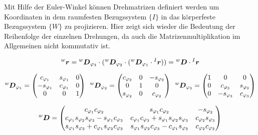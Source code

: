Mit Hilfe der Euler-Winkel können Drehmatrizen definiert werden um Koordinaten in dem raumfesten Bezugssystem $\{I\}$ in das körperfeste Bezugssystem $\{W\}$ zu projizieren. Hier zeigt sich wieder die Bedeutung der Reihenfolge der einzelnen Drehungen, da auch die Matrizenmultiplikation im Allgemeinen nicht kommutativ ist.

\begin{equation}
\prescript{w}{}{}\boldsymbol{r} = \prescript{w}{}{}\boldsymbol{D}_{\varphi_3} \cdot ( \prescript{w}{}{}\boldsymbol{D}_{\varphi_2} \cdot ( \prescript{w}{}{}\boldsymbol{D}_{\varphi_1} \cdot \prescript{I}{}{}\boldsymbol{r} )) = \prescript{w}{}{}\boldsymbol{D} \cdot \prescript{I}{}{}\boldsymbol{r}
\end{equation}

\begin{equation}
\prescript{w}{}{}\boldsymbol{D}_{\varphi_1} = \begin{pmatrix}
c_{\varphi_1} & s_{\varphi_1} & 0 \\
-s_{\varphi_1} & c_{\varphi_1} & 0 \\
0 & 0 & 1
\end{pmatrix}
\hspace{5pt}
\prescript{w}{}{}\boldsymbol{D}_{\varphi_2} = \begin{pmatrix}
c_{\varphi_2} & 0 & -s_{\varphi_2} \\
0 & 1 & 0 \\
s_{\varphi_2} & 0 & c_{\varphi_2}
\end{pmatrix}
\hspace{5pt}
\prescript{w}{}{}\boldsymbol{D}_{\varphi_3} = \begin{pmatrix}
1 & 0 & 0  \\
0 & c_{\varphi_3} & s_{\varphi_3} \\
0 & -s_{\varphi_3} & c_{\varphi_3}
\end{pmatrix}
\end{equation}

\begin{equation}
\prescript{w}{}{}\boldsymbol{D} = \begin{pmatrix}
c_{\varphi_1}c_{\varphi_2} & 
s_{\varphi_1}c_{\varphi_2} &
-s_{\varphi_2} 
\\
c_{\varphi_1} s_{\varphi_2} s_{\varphi_3} - s_{\varphi_1}c_{\varphi_3}&
c_{\varphi_1}c_{\varphi_3} + s_{\varphi_1}s_{\varphi_2}s_{\varphi_3}&
c_{\varphi_2} s_{\varphi_3}
\\
s_{\varphi_1}s_{\varphi_3}+c_{\varphi_1}s_{\varphi_2}c_{\varphi_3} &
s_{\varphi_1}s_{\varphi_2}c_{\varphi_3} - c_{\varphi_1}s_{\varphi_3}&
c_{\varphi_2}c_{\varphi_3}
\end{pmatrix}
\end{equation}

